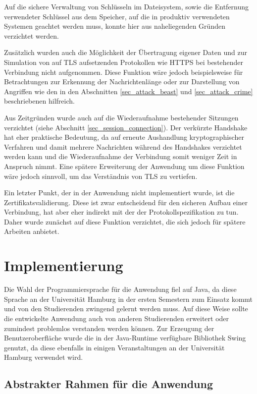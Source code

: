 Auf die sichere Verwaltung von Schlüsseln im Dateisystem, sowie die Entfernung verwendeter Schlüssel aus dem Speicher, auf die in produktiv verwendeten Systemen geachtet werden muss, konnte hier aus naheliegenden Gründen verzichtet werden.

Zusätzlich wurden auch die Möglichkeit der Übertragung eigener Daten und zur Simulation von auf TLS aufsetzenden Protokollen wie HTTPS bei bestehender Verbindung nicht aufgenommen. Diese Funktion wäre jedoch beispielsweise für Betrachtungen zur Erkennung der Nachrichtenlänge oder zur Darstellung von Angriffen wie den in den Abschnitten \ref{sec_attack_beast} und \ref{sec_attack_crime} beschriebenen hilfreich.

Aus Zeitgründen wurde auch auf die Wiederaufnahme bestehender Sitzungen verzichtet (siehe Abschnitt \ref{sec_session_connection}). Der verkürzte Handshake hat eher praktische Bedeutung, da auf erneute Aushandlung kryptographischer Verfahren und damit mehrere Nachrichten während des Handshakes verzichtet werden kann und die Wiederaufnahme der Verbindung somit weniger Zeit in Anspruch nimmt. Eine spätere Erweiterung der Anwendung um diese Funktion wäre jedoch sinnvoll, um das Verständnis von TLS zu vertiefen.

Ein letzter Punkt, der in der Anwendung nicht implementiert wurde, ist die Zertifikatsvalidierung. Diese ist zwar entscheidend für den sicheren Aufbau einer Verbindung, hat aber eher indirekt mit der der Protokollspezifikation zu tun. Daher wurde zunächst auf diese Funktion verzichtet, die sich jedoch für spätere Arbeiten anbietet.

\section{Implementierung}

Die Wahl der Programmiersprache für die Anwendung fiel auf Java, da diese Sprache an der Universität Hamburg in der ersten Semestern zum Einsatz kommt und von den Studierenden zwingend gelernt werden muss. Auf diese Weise sollte die entwickelte Anwendung auch von anderen Studierenden erweitert oder zumindest problemlos verstanden werden können. Zur Erzeugung der Benutzeroberfläche wurde die in der Java-Runtime verfügbare Bibliothek Swing genutzt, da diese ebenfalls in einigen Veranstaltungen an der Universität Hamburg verwendet wird.

\subsection{Abstrakter Rahmen für die Anwendung}

